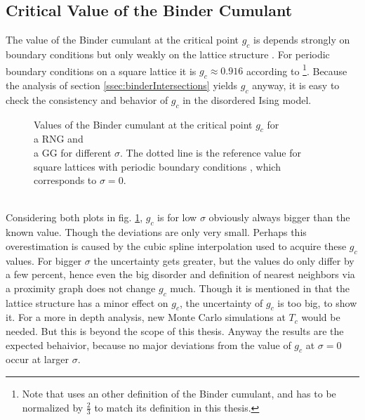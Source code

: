 \subsection{Critical Value of the Binder Cumulant}
    The value of the Binder cumulant at the critical point \(g_c\) is
    depends strongly on boundary conditions but only weakly on the lattice
    structure \cite{BinderValue}. For periodic boundary conditions on a
    square lattice it is \(g_c \approx 0.916\) according to \cite{BinderValue}
        \footnote{Note that \cite{BinderValue} uses an other definition of
            the Binder cumulant, and has to be normalized by \(\frac{2}{3}\)
            to match its definition in this thesis.}.
    Because the analysis of section \ref{ssec:binderIntersections}
    yields \(g_c\) anyway, it is easy to check the consistency and
    behavior of \(g_c\) in the disordered Ising model.\\
    \begin{figure}[htbp]
        \centering
        \caption[Values of the Binder cumulant at the critical point $g_c$]
        {
            Values of the Binder cumulant at the critical point \(g_c\)
            for\\
             a RNG and\\
             a GG for different \(\sigma\).
            The dotted line is the reference value for square lattices
            with periodic boundary conditions \cite{BinderValue}, which
            corresponds to \(\sigma = 0\).
        }
        \label{fig:TcG}
    \end{figure}\\
    Considering both plots in fig. \ref{fig:TcG}, \(g_c\) is for low
    \(\sigma\) obviously always bigger than the known value. Though the
    deviations are only very small. Perhaps this overestimation is caused
    by the cubic spline interpolation used to acquire these \(g_c\) values.
    For bigger \(\sigma\) the uncertainty gets greater, but the values
    do only differ by a few percent, hence even the big disorder and
    definition of nearest neighbors via a proximity graph does not change
    \(g_c\) much. Though it is mentioned in \cite{BinderValue} that the
    lattice structure has a minor effect on \(g_c\), the uncertainty of
    \(g_c\) is too big, to show it. For a more in depth analysis, new
    Monte Carlo simulations at \(T_c\) would be needed. But this is
    beyond the scope of this thesis. Anyway the results are the expected
    behaivior, because no major deviations from the value of \(g_c\) at
    \(\sigma = 0\) occur at larger \(\sigma\).
